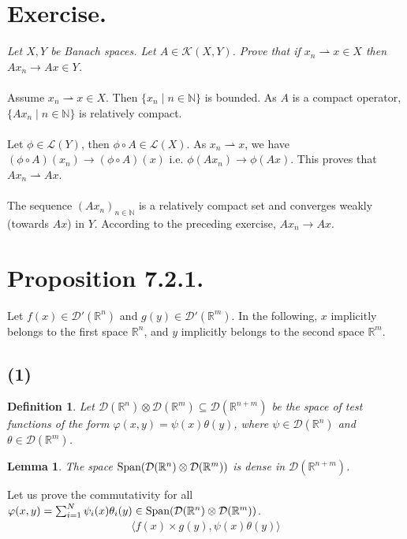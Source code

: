 \documentclass[11pt,a4paper]{article}
\newtheorem{defi}{Definition}
\newtheorem{lem}{Lemma}
\newcommand{\La}{\mathcal{L}}
\newcommand{\ph}{\varphi}
\newcommand{\il}{\textit}
\newcommand{\N}{\mathbb{N}}
\newcommand{\R}{\mathbb{R}}
\newcommand{\1}{\mathbbm{1}}
\newcommand{\D}{\mathcal{D}}
\begin{document}
\section*{Exercise.}
\il{Let $X,Y$ be Banach spaces. Let $A \in \mathcal{K}(X,Y)$. Prove that if $x_n \rightharpoonup x \in X$ then $Ax_n \to Ax \in Y$.}\\\\
Assume $x_n \rightharpoonup x \in X$. Then $\{x_n \mid n\in\N \}$ is bounded. As $A$ is a compact operator, $\{ Ax_n \mid n\in\N\}$ is relatively compact.\\\\
Let $\phi \in \La(Y)$, then $\phi \circ A \in \La(X)$. As $x_n \rightharpoonup x$, we have $(\phi \circ A)(x_n) \to (\phi \circ A)(x)$ i.e. $\phi(Ax_n) \to \phi(Ax)$. This proves that $Ax_n \rightharpoonup Ax$.\\\\
The sequence $(Ax_n)_{n\in\N}$ is a relatively compact set and converges weakly (towards $Ax$) in $Y$. According to the preceding exercise, $Ax_n \to Ax$.\newpage

\section*{Proposition 7.2.1.}
Let $f(x) \in \mathcal{D}'(\R^n)$ and $g(y) \in \mathcal{D}'(\R^m)$. In the following, $x$ implicitly belongs to the first space $\R^n$, and $y$ implicitly belongs to the second space $\R^m$.
\subsection*{(1)}
\begin{defi}
Let $\D(\R^n) \otimes \D(\R^m) \subseteq \D(\R^{n+m})$ be the space of test functions of the form $\ph(x,y) = \psi(x)\theta(y)$, where $\psi \in \D(\R^n)$ and $\theta \in \D(\R^m)$.
\end{defi}
\begin{lem}
The space $\textnormal{Span}(\D(\R^n) \otimes \D(\R^m))$ is dense in $\D(\R^{n+m})$.
\end{lem}
Let us prove the commutativity for all $\ph(x,y) = \sum_{i=1}^N \psi_i(x)\theta_i(y) \in \textnormal{Span}(\D(\R^n) \otimes \D(\R^m))$.
\begin{align*}
\langle f(x) \times g(y) , \psi(x)\theta(y) \rangle
\end{align*}
\end{document}

